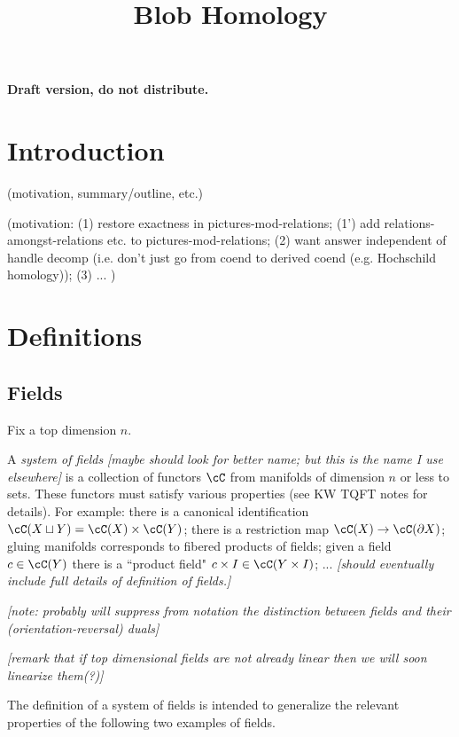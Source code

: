 \documentclass[11pt,leqno]{amsart}
\title{Blob Homology}
\def\du{\sqcup}
\def\bd{\partial}
\def\nn#1{{{\it \small [#1]}}}
\begin{document}
\makeatletter
{}
\gdef\theequation{\thesection.\arabic{equation}}
\makeatother


\maketitle

\textbf{Draft version, do not distribute. \versioninfo}

\section{Introduction}

(motivation, summary/outline, etc.)

(motivation:
(1) restore exactness in pictures-mod-relations;
(1') add relations-amongst-relations etc. to pictures-mod-relations;
(2) want answer independent of handle decomp (i.e. don't
just go from coend to derived coend (e.g. Hochschild homology));
(3) ...
)

\section{Definitions}

\subsection{Fields}

Fix a top dimension $n$.

A {\it system of fields}
\nn{maybe should look for better name; but this is the name I use elsewhere}
is a collection of functors $\cC$ from manifolds of dimension $n$ or less
to sets.
These functors must satisfy various properties (see KW TQFT notes for details).
For example:
there is a canonical identification $\cC(X \du Y) = \cC(X) \times \cC(Y)$;
there is a restriction map $\cC(X) \to \cC(\bd X)$;
gluing manifolds corresponds to fibered products of fields;
given a field $c \in \cC(Y)$ there is a ``product field"
$c\times I \in \cC(Y\times I)$; ...
\nn{should eventually include full details of definition of fields.}

\nn{note: probably will suppress from notation the distinction
between fields and their (orientation-reversal) duals}

\nn{remark that if top dimensional fields are not already linear
then we will soon linearize them(?)}

The definition of a system of fields is intended to generalize
the relevant properties of the following two examples of fields.
\end{document}
